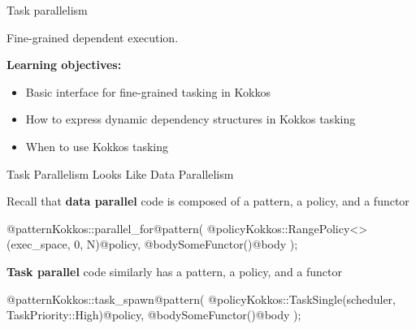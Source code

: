 

\begin{frame}[fragile]

  {\Huge Task parallelism}

  \vspace{10pt}

  {\large Fine-grained dependent execution.}

  \vspace{20pt}

  \textbf{Learning objectives:}
  \begin{itemize}
    \item {Basic interface for fine-grained tasking in Kokkos}
    \item {How to express dynamic dependency structures in Kokkos tasking}
    \item {When to use Kokkos tasking}
  \end{itemize}

  \vspace{-20pt}

\end{frame}


\begin{frame}[fragile]{Task Parallelism Looks Like Data Parallelism}

    Recall that {\textbf{data parallel}} code is composed of a {\color{patternColor!80!black} pattern}, a {\color{policyColor!80!black} policy}, and a {\color{bodyColor!80!black} functor}

    \vspace{3pt}

    \begin{code}[linebackgroundcolor={},keywords={}]
@patternKokkos::parallel_for@pattern(
  @policyKokkos::RangePolicy<>(exec_space, 0, N)@policy,
  @bodySomeFunctor()@body
);
  \end{code}
    \vspace{8pt}

    \textbf{Task parallel} code similarly has a {\color{patternColor!80!black} pattern}, a {\color{policyColor!80!black} policy}, and a {\color{bodyColor!80!black} functor}

    \vspace{3pt}

    \begin{code}[linebackgroundcolor={},keywords={}]
@patternKokkos::task_spawn@pattern(
  @policyKokkos::TaskSingle(scheduler, TaskPriority::High)@policy,
  @bodySomeFunctor()@body
);
    \end{code}
\end{frame}

